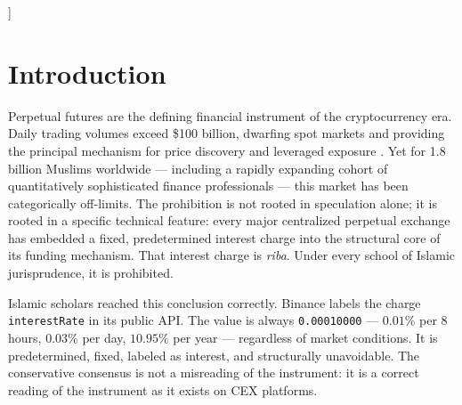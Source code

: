 \documentclass[10pt,twocolumn]{article}
\begin{document}
\begin{@twocolumnfalse}
\begin{abstract}
Principles-based Shariah analysis confirms that premium-only DEX perpetuals,
when used on economically productive underlying assets with disciplined risk
management, satisfy El-Gamal's riba conditions, Kamali's standardisation
criterion, and Salamon's maysir test. This paper demonstrates that Shariah
compliance in perpetual futures is achievable through proactive structural
design --- specifically, the elimination of the fixed interest parameter from
the funding formula --- and provides a principled framework for evaluating,
structuring, and implementing compliant perpetual contracts.

\medskip
\noindent\textbf{Keywords:} \textit{riba}, \textit{gharar}, \textit{maysir},
perpetual futures, Islamic finance, DeFi, DEX, Shariah compliance, funding rate,
decentralized exchange, halal trading
\end{abstract}
\bigskip
\end{@twocolumnfalse}]

\section{Introduction}

Perpetual futures are the defining financial instrument of the cryptocurrency
era. Daily trading volumes exceed \$100 billion, dwarfing spot markets and
providing the principal mechanism for price discovery and leveraged exposure
\cite{Chainalysis2025,CoinGecko2025}. Yet for 1.8 billion Muslims worldwide
--- including a rapidly expanding cohort of quantitatively sophisticated
finance professionals --- this market has been categorically off-limits. The
prohibition is not rooted in speculation alone; it is rooted in a specific
technical feature: every major centralized perpetual exchange has embedded a
fixed, predetermined interest charge into the structural core of its funding
mechanism. That interest charge is \textit{riba}. Under every school of Islamic
jurisprudence, it is prohibited.

Islamic scholars reached this conclusion correctly. Binance labels the charge
\texttt{interestRate} in its public API. The value is always
\texttt{0.00010000} --- $0.01\%$ per 8 hours, $0.03\%$ per day, $10.95\%$ per
year --- regardless of market conditions. It is predetermined, fixed,
labeled as interest, and structurally unavoidable. The conservative consensus
\cite{Musaffa2024,IslamQA2023,PracticalIF2023,Indonesian2024,Alias2021} is
not a misreading of the instrument: it is a correct reading of the instrument
as it exists on CEX platforms.
\end{document}
